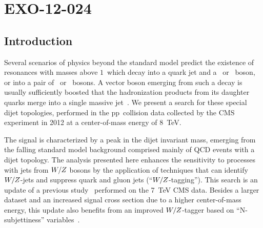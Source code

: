 \chapter{EXO-12-024}
\section{Introduction}
\label{sec:introduction}

Several scenarios of physics beyond the standard model predict the
existence of resonances with masses above $1$~\TeVcc which decay into a
quark jet and a \PW\ or \cPZ\ boson, or into a pair of \PW\ or \cPZ\
bosons.  A vector boson emerging from such a decay is usually
sufficiently boosted that the hadronization products from its daughter
quarks merge into a single massive jet~\cite{Gouzevitch:2013qca}.  We
present a search for these special dijet topologies, performed in the
pp~collision data collected by the CMS experiment
in 2012 at a center-of-mass energy of 8~TeV.

The signal is characterized by a peak in the dijet invariant mass,
emerging from the falling standard model background comprised mainly
of QCD events with a dijet topology. The analysis presented here
enhances the sensitivity to processes with jets from $W/Z$ bosons
by the application of techniques that can identify $W/Z$-jets and
suppress quark and gluon jets (``$W/Z$-tagging'').  This search
is an update of a previous study~\cite{ref_2011} performed on the
7~TeV CMS data. Besides a larger dataset and an increased signal cross
section due to a higher center-of-mass energy, this update also
benefits from an improved $W/Z$-tagger based on
``N-subjettiness'' variables~\cite{Thaler:2010tr}.

